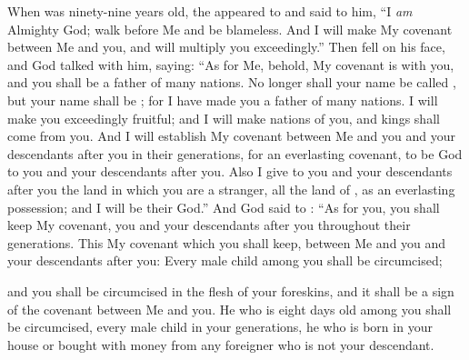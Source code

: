 
\bverse When  was ninety-nine years old, the \lord appeared to  and said to him, ``I \textit{am} Almighty God; walk before Me and be blameless.
\bverse And I will make My covenant between Me and you, and will multiply you exceedingly.''
\bverse Then  fell on his face, and God talked with him, saying: 
\bverse ``As for Me, behold, My covenant is with you, and you shall be a father of many nations.
\bverse No longer shall your name be called , but your name shall be ; for I have made you a father of many nations.
\bverse I will make you exceedingly fruitful; and I will make nations of you, and kings shall come from you.
\bverse And I will establish My covenant between Me and you and your descendants after you in their generations, for an everlasting covenant, to be God to you and your descendants after you.
\bverse Also I give to you and your descendants after you the  land in which you are a stranger, all the land of , as an everlasting possession; and I will be their God.''
\bverse And God said to : ``As for you, you shall keep My covenant, you and your descendants after you throughout their generations.
\bverse This \is My covenant which you shall keep, between Me and you and your descendants after you: Every male child among you shall be circumcised;

\bverse and you shall be circumcised in the flesh of your foreskins, and it shall be a sign of the covenant between Me and you.
\bverse He who is eight days old among you shall be circumcised, every male child in your generations, he who is born in your house or bought with money from any foreigner who is not your descendant.

